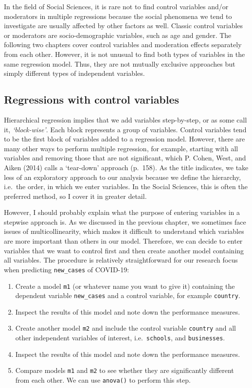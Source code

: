 \documentclass[
  letterpaper,
]{krantz}
\providecommand{\tightlist}{%
  \setlength{\itemsep}{0pt}\setlength{\parskip}{0pt}}\usepackage{longtable,booktabs,array}
\begin{document}
In the field of Social Sciences, it is rare not to find control
variables and/or moderators in multiple regressions because the social
phenomena we tend to investigate are usually affected by other factors
as well. Classic control variables or moderators are socio-demographic
variables, such as age and gender. The following two chapters cover
control variables and moderation effects separately from each other.
However, it is not unusual to find both types of variables in the same
regression model. Thus, they are not mutually exclusive approaches but
simply different types of independent variables.

\subsection{Regressions with control
variables}\label{sec-regressions-with-control-variables}

Hierarchical regression implies that we add variables step-by-step, or
as some call it, \emph{`block-wise'}. Each block represents a group of
variables. Control variables tend to be the first block of variables
added to a regression model. However, there are many other ways to
perform multiple regression, for example, starting with all variables
and removing those that are not significant, which P. Cohen, West, and
Aiken (2014) calls a `tear-down' approach (p.~158). As the title
indicates, we take less of an exploratory approach to our analysis
because we define the hierarchy, i.e.~the order, in which we enter
variables. In the Social Sciences, this is often the preferred method,
so I cover it in greater detail.

However, I should probably explain what the purpose of entering
variables in a stepwise approach is. As we discussed in the previous
chapter, we sometimes face issues of multicollinearity, which makes it
difficult to understand which variables are more important than others
in our model. Therefore, we can decide to enter variables that we want
to control first and then create another model containing all variables.
The procedure is relatively straightforward for our research focus when
predicting \texttt{new\_cases} of COVID-19:

\begin{enumerate}
\def\labelenumi{\arabic{enumi}.}
\tightlist
\item
  Create a model \texttt{m1} (or whatever name you want to give it)
  containing the dependent variable \texttt{new\_cases} and a control
  variable, for example \texttt{country}.
\item
  Inspect the results of this model and note down the performance
  measures.
\item
  Create another model \texttt{m2} and include the control variable
  \texttt{country} and all other independent variables of interest,
  i.e.~\texttt{schools}, and \texttt{businesses}.
\item
  Inspect the results of this model and note down the performance
  measures.
\item
  Compare models \texttt{m1} and \texttt{m2} to see whether they are
  significantly different from each other. We can use \texttt{anova()}
  to perform this step.
\end{enumerate}
\end{document}
